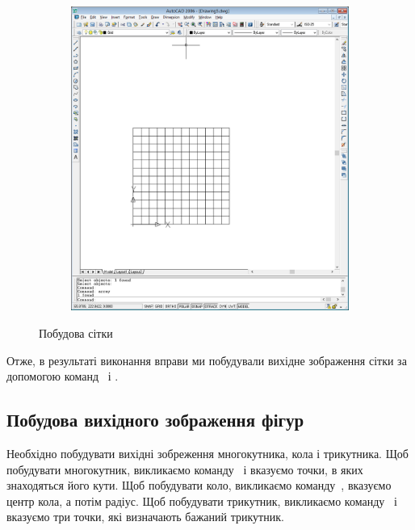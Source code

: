 \documentclass[
	a4paper,
	oneside,
	BCOR = 10mm,
	DIV = 12,
	12pt,
	headings = normal,
]{scrartcl}
\newlength{\gridunitwidth}
\begin{document}
\begin{figure}[!htbp]
\begin{subfigure}[b]{4 \gridunitwidth - (2em / 3)}
					\caption{}
					\label{subfig:01-grid-cell-array}
				\end{subfigure}%
				\hspace{1em}%
				\begin{subfigure}[b]{4 \gridunitwidth - (2em / 3)}
					\centering
					\includegraphics[width = \columnwidth]{./assets/p03.png}
					\caption{}
					\label{subfig:01-grid}
				\end{subfigure}
				\caption{Побудова сітки}
				\label{fig:01-grid-construction}
			\end{figure}

			Отже, в результаті виконання вправи ми побудували вихідне зображення сітки за допомогою команд~ і .

		\subsection{Побудова вихідного зображення фігур}
			Необхідно побудувати вихідні зобреження многокутника, кола і трикутника. Щоб побудувати многокутник, викликаємо команду~ і вказуємо точки, в яких знаходяться його кути. Щоб побудувати коло, викликаємо команду~, вказуємо центр кола, а потім радіус. Щоб побудувати трикутник, викликаємо команду~ і вказуємо три точки, які визначають бажаний трикутник.
\end{document}
